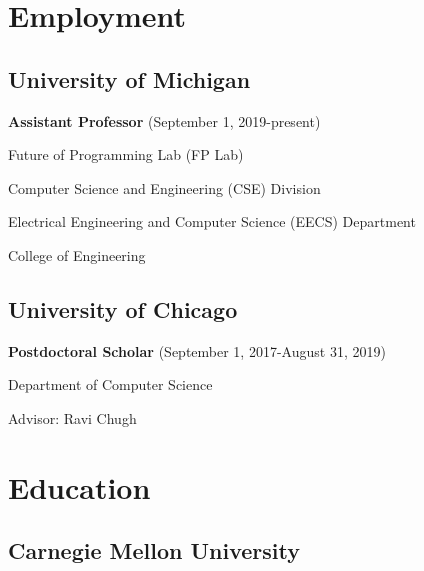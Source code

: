 \documentclass[10pt,letterpaper]{article}
\renewenvironment{itemize}{
  \begin{list}{}{
    \setlength{\leftmargin}{1.25em}
    \setlength{\itemsep}{0.25em}
    \setlength{\parskip}{0pt}
    \setlength{\parsep}{0.2em}
  }
}{
  \end{list}
}
\begin{document}
\section*{Employment}

\subsection*{University of Michigan}
  \begin{itemize}
    \item \textbf{Assistant Professor} (September 1, 2019-present)
    \item Future of Programming Lab (FP Lab)
    \item Computer Science and Engineering (CSE) Division
    \item Electrical Engineering and Computer Science (EECS) Department
    \item College of Engineering
  \end{itemize}

\subsection*{University of Chicago}
  \begin{itemize}
    \item \textbf{Postdoctoral Scholar} (September 1, 2017-August 31, 2019)
    \item Department of Computer Science
    \item Advisor: Ravi Chugh
  \end{itemize}


\section*{Education}

\subsection*{Carnegie Mellon University}
\end{document}
